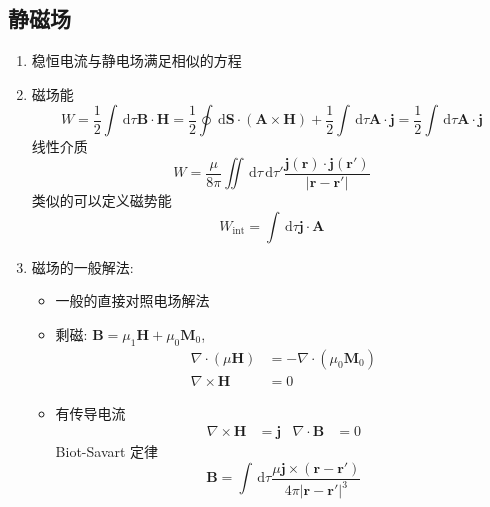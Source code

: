 \documentclass[12pt,a4paper]{article}%
\numberwithin{equation}{section}%
\renewcommand*{\vec}[1]{\bm{#1}}%
\newcommand{\dif}{\,\mathrm d}
\begin{document}
\subsection{静磁场} %
\label{sub:static_mag}
\begin{enumerate}
    \item 稳恒电流与静电场满足相似的方程
    \item 磁场能
    \begin{equation}
        W = \frac 12\int\dif \tau\vec B\cdot\vec H = \frac 12\oint\dif\vec S\cdot(\vec A\times\vec H) + \frac 12\int\dif \tau\vec A\cdot\vec j = \frac 12\int\dif \tau\vec A\cdot\vec j
    \end{equation}
    线性介质
    \begin{equation}
        W = \frac{\mu}{8\pi}\iint\dif \tau\dif \tau'\frac{\vec j(\vec r)\cdot\vec j(\vec r')}{|\vec r - \vec r'|}
    \end{equation}
    类似的可以定义磁势能
    \begin{equation}
        W_{\mathrm{int}} = \int\dif \tau\vec j \cdot \vec A
    \end{equation}
    \item 磁场的一般解法: 
    \begin{itemize}
        \item 一般的直接对照电场解法
        \item 剩磁: $\vec B = \mu_1\vec H + \mu_0 \vec M_0$, 
        \begin{align}
            \nabla\cdot(\mu\vec H) &= -\nabla\cdot(\mu_0\vec M_0) \\
            \nabla\times\vec H &= 0
        \end{align}
        \item 有传导电流
        \begin{align}
            \nabla\times\vec H &= \vec j &
            \nabla\cdot\vec B &= 0
        \end{align}
        Biot-Savart 定律
        \begin{equation}
            \vec B = \int\dif \tau \frac{\mu\vec j \times (\vec r - \vec r')}{4\pi|\vec r - \vec r'|^3}
        \end{equation}
    \end{itemize}
\end{enumerate}
\end{document}
